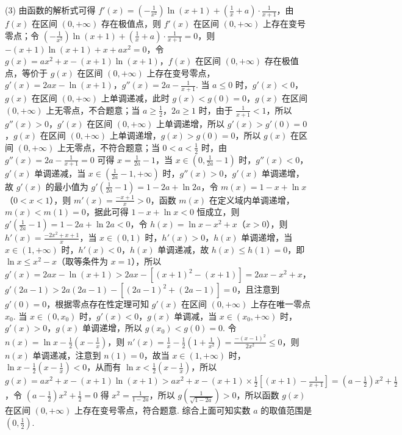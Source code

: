 \begin{question}[points=12]
\begin{solution}
(3) 由函数的解析式可得 $f'(x)=(-\frac{1}{x^2})\ln(x+1)+(\frac{1}{x}+a)\cdot\frac{1}{x+1}$，由 $f(x)$ 在区间 $(0,+\infty)$ 存在极值点，则 $f'(x)$ 在区间 $(0,+\infty)$ 上存在变号零点；令 $(-\frac{1}{x^2})\ln(x+1)+(\frac{1}{x}+a)\cdot\frac{1}{x+1}=0$，则 $-(x+1)\ln(x+1)+x+ax^2=0$，令 $g(x)=ax^2+x-(x+1)\ln(x+1)$，$f(x)$ 在区间 $(0,+\infty)$ 存在极值点，等价于 $g(x)$ 在区间 $(0,+\infty)$ 上存在变号零点，$g'(x)=2ax-\ln(x+1)$，$g''(x)=2a-\frac{1}{x+1}$. 当 $a\le0$ 时，$g'(x)<0$，$g(x)$ 在区间 $(0,+\infty)$ 上单调递减，此时 $g(x)<g(0)=0$，$g(x)$ 在区间 $(0,+\infty)$ 上无零点，不合题意；当 $a\ge\frac{1}{2}$，$2a\ge1$ 时，由于 $\frac{1}{x+1}<1$，所以 $g''(x)>0$，$g'(x)$ 在区间 $(0,+\infty)$ 上单调递增，所以 $g'(x)>g'(0)=0$，$g(x)$ 在区间 $(0,+\infty)$ 上单调递增，$g(x)>g(0)=0$，所以 $g(x)$ 在区间 $(0,+\infty)$ 上无零点，不符合题意；当 $0<a<\frac{1}{2}$ 时，由 $g''(x)=2a-\frac{1}{x+1}=0$ 可得 $x=\frac{1}{2a}-1$，当 $x\in(0,\frac{1}{2a}-1)$ 时，$g''(x)<0$，$g'(x)$ 单调递减，当 $x\in(\frac{1}{2a}-1,+\infty)$ 时，$g''(x)>0$，$g'(x)$ 单调递增，故 $g'(x)$ 的最小值为 $g'(\frac{1}{2a}-1)=1-2a+\ln2a$，令 $m(x)=1-x+\ln x$（$0<x<1$），则 $m'(x)=\frac{-x+1}{x}>0$，函数 $m(x)$ 在定义域内单调递增，$m(x)<m(1)=0$，据此可得 $1-x+\ln x<0$ 恒成立，则 $g'(\frac{1}{2a}-1)=1-2a+\ln2a<0$，令 $h(x)=\ln x-x^2+x$（$x>0$），则 $h'(x)=\frac{-2x^2+x+1}{x}$，当 $x\in(0,1)$ 时，$h'(x)>0$，$h(x)$ 单调递增，当 $x\in(1,+\infty)$ 时，$h'(x)<0$，$h(x)$ 单调递减，故 $h(x)\le h(1)=0$，即 $\ln x\le x^2-x$（取等条件为 $x=1$），所以 $g'(x)=2ax-\ln(x+1)>2ax-[(x+1)^2-(x+1)]=2ax-x^2+x$，$g'(2a-1)>2a(2a-1)-[(2a-1)^2+(2a-1)]=0$，且注意到 $g'(0)=0$，根据零点存在性定理可知 $g'(x)$ 在区间 $(0,+\infty)$ 上存在唯一零点 $x_0$. 当 $x\in(0,x_0)$ 时，$g'(x)<0$，$g(x)$ 单调减，当 $x\in(x_0,+\infty)$ 时，$g'(x)>0$，$g(x)$ 单调递增，所以 $g(x_0)<g(0)=0$. 令 $n(x)=\ln x-\frac{1}{2}(x-\frac{1}{x})$，则 $n'(x)=\frac{1}{x}-\frac{1}{2}(1+\frac{1}{x^2})=\frac{-(x-1)^2}{2x^2}\le0$，则 $n(x)$ 单调递减，注意到 $n(1)=0$，故当 $x\in(1,+\infty)$ 时，$\ln x-\frac{1}{2}(x-\frac{1}{x})<0$，从而有 $\ln x<\frac{1}{2}(x-\frac{1}{x})$，所以 $g(x)=ax^2+x-(x+1)\ln(x+1)>ax^2+x-(x+1)\times\frac{1}{2}[(x+1)-\frac{1}{x+1}]=(a-\frac{1}{2})x^2+\frac{1}{2}$，令 $(a-\frac{1}{2})x^2+\frac{1}{2}=0$ 得 $x^2=\frac{1}{1-2a}$，所以 $g(\frac{1}{\sqrt{1-2a}})>0$，所以函数 $g(x)$ 在区间 $(0,+\infty)$ 上存在变号零点，符合题意. 综合上面可知实数 $a$ 的取值范围是 $(0,\frac{1}{2})$.
\end{solution}
\end{question}

